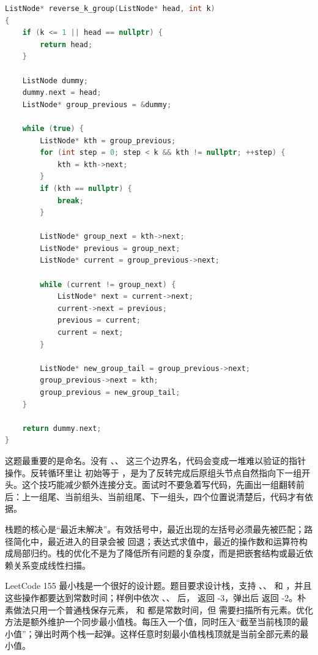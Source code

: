\begin{lstlisting}[language=C++,caption={LeetCode 25 K 个一组翻转链表：先找边界再局部反转}]
ListNode* reverse_k_group(ListNode* head, int k)
{
    if (k <= 1 || head == nullptr) {
        return head;
    }

    ListNode dummy;
    dummy.next = head;
    ListNode* group_previous = &dummy;

    while (true) {
        ListNode* kth = group_previous;
        for (int step = 0; step < k && kth != nullptr; ++step) {
            kth = kth->next;
        }
        if (kth == nullptr) {
            break;
        }

        ListNode* group_next = kth->next;
        ListNode* previous = group_next;
        ListNode* current = group_previous->next;

        while (current != group_next) {
            ListNode* next = current->next;
            current->next = previous;
            previous = current;
            current = next;
        }

        ListNode* new_group_tail = group_previous->next;
        group_previous->next = kth;
        group_previous = new_group_tail;
    }

    return dummy.next;
}
\end{lstlisting}

这题最重要的是命名。没有 、、 这三个边界名，代码会变成一堆难以验证的指针操作。反转循环里让  初始等于 ，是为了反转完成后原组头节点自然指向下一组开头。这个技巧能减少额外连接分支。面试时不要急着写代码，先画出一组翻转前后：上一组尾、当前组头、当前组尾、下一组头，四个位置说清楚后，代码才有依据。

栈题的核心是“最近未解决”。有效括号中，最近出现的左括号必须最先被匹配；路径简化中，最近进入的目录会被  回退；表达式求值中，最近的操作数和运算符构成局部归约。栈的优化不是为了降低所有问题的复杂度，而是把嵌套结构或最近依赖关系变成线性扫描。

LeetCode 155 最小栈是一个很好的设计题。题目要求设计栈，支持 、、 和 ，并且这些操作都要达到常数时间；样例中依次 、、 后， 返回 -3，弹出后  返回 -2。朴素做法只用一个普通栈保存元素， 和  都是常数时间，但  需要扫描所有元素。优化方法是额外维护一个同步最小值栈。每压入一个值，同时压入“截至当前栈顶的最小值”；弹出时两个栈一起弹。这样任意时刻最小值栈栈顶就是当前全部元素的最小值。

